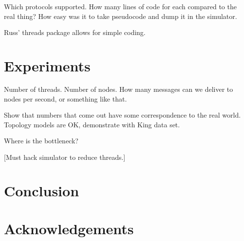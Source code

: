 \documentclass[letterpaper,twocolumn,10pt]{article}
\begin{document}
Which protocols supported.  How many lines of code for each compared to the
real thing?  How easy was it to take pseudocode and dump it in the simulator.

Russ' threads package allows for simple coding.

\section{Experiments}
\label{Section:Experiments}

Number of threads.  Number of nodes.  How many messages can we deliver to
nodes per second, or something like that.

Show that numbers that come out have some correspondence to the real world.
Topology models are OK, demonstrate with King data set.

Where is the bottleneck?

[Must hack simulator to reduce threads.]


\section{Conclusion}
\label{Section:Conclusion}

\section{Acknowledgements}
\label{Section:Acknowledgements}

\vfill

\pagebreak

\end{document}
